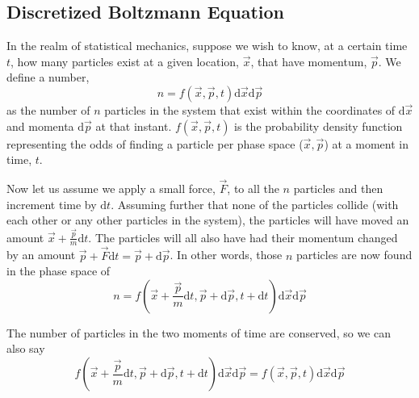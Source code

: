 \subsection{Discretized Boltzmann Equation}\label{sec:lbm-intro}

In the realm of statistical mechanics, suppose we wish to know, at a certain time $t$, how many particles exist at a given location, $\vec{x}$, that have momentum, $\vec{p}$. We define a number,
\begin{equation}
	n = f(\vec{x},\vec{p},t)\mathrm{d}\vec{x}\mathrm{d}\vec{p}
\end{equation}
as the number of $n$ particles in the system that exist within the coordinates of $\mathrm{d}\vec{x}$ and momenta $\mathrm{d}\vec{p}$ at that instant. $f(\vec{x},\vec{p},t)$ is the probability density function representing the odds of finding a particle per phase space ($\vec{x},\vec{p}$) at a moment in time, $t$.

Now let us assume we apply a small force, $\vec{F}$, to all the $n$ particles and then increment time by $\mathrm{d}t$. Assuming further that none of the particles collide (with each other or any other particles in the system), the particles will have moved an amount $\vec{x} + \frac{\vec{p}}{m}\mathrm{d}t$. The particles will all also have had their momentum changed by an amount $\vec{p} + \vec{F}\mathrm{d}t = \vec{p} + \mathrm{d}\vec{p}$. In other words, those $n$ particles are now found in the phase space of
\begin{equation}
 	n = f(\vec{x} + \frac{\vec{p}}{m}\mathrm{d}t,\vec{p} + \mathrm{d}\vec{p},t + \mathrm{d}t)\mathrm{d}\vec{x}\mathrm{d}\vec{p}
 \end{equation}

The number of particles in the two moments of time are conserved, so we can also say
\begin{equation}
	f(\vec{x} + \frac{\vec{p}}{m}\mathrm{d}t,\vec{p} + \mathrm{d}\vec{p},t + \mathrm{d}t)\mathrm{d}\vec{x}\mathrm{d}\vec{p} = f(\vec{x},\vec{p},t)\mathrm{d}\vec{x}\mathrm{d}\vec{p}
\end{equation}

